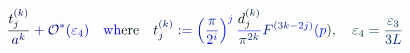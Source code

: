 \documentclass[12pt]{article}
\begin{document}
\makeatletter
\renewcommand*{\@textcolor}[3]{%
  \protect\leavevmode
  \begingroup
    \color#1{#2}#3%
  \endgroup
}
\makeatother
\begin{displaymath}
\mathcolor[RGB]{0,0,15}{\frac { \mathcolor[RGB]{0,0,30}{t} _ { \mathcolor[RGB]{0,0,45}{j} } ^ { \mathcolor[RGB]{0,0,60}{(} \mathcolor[RGB]{0,0,75}{k} \mathcolor[RGB]{0,0,90}{)} } } { \mathcolor[RGB]{0,0,105}{a} ^ { \mathcolor[RGB]{0,0,120}{k} } } } \mathcolor[RGB]{0,0,135}{+} \mathcal { \mathcolor[RGB]{0,0,150}{O} } ^ { \mathcolor[RGB]{0,0,165}{*} } \mathcolor[RGB]{0,0,180}{(} \mathcolor[RGB]{0,0,195}{\varepsilon} _ { \mathcolor[RGB]{0,0,210}{4} } \mathcolor[RGB]{0,0,225}{)} \quad \mathrm { \mathcolor[RGB]{0,0,240}{w} \mathcolor[RGB]{0,0,255}{h} \mathcolor[RGB]{0,15,0}{e} \mathcolor[RGB]{0,15,15}{r} \mathcolor[RGB]{0,15,30}{e} } \quad \mathcolor[RGB]{0,15,45}{t} _ { \mathcolor[RGB]{0,15,60}{j} } ^ { \mathcolor[RGB]{0,15,75}{(} \mathcolor[RGB]{0,15,90}{k} \mathcolor[RGB]{0,15,105}{)} } \mathcolor[RGB]{0,15,120}{:} \mathcolor[RGB]{0,15,135}{=} \mathcolor[RGB]{0,15,150}{\left(} \mathcolor[RGB]{0,15,165}{\frac { \mathcolor[RGB]{0,15,180}{\pi} } { \mathcolor[RGB]{0,15,195}{2} ^ { \mathcolor[RGB]{0,15,210}{i} } } } \mathcolor[RGB]{0,15,225}{\right)} ^ { \mathcolor[RGB]{0,15,240}{j} } \mathcolor[RGB]{0,15,255}{\frac { \mathcolor[RGB]{0,30,0}{d} _ { \mathcolor[RGB]{0,30,15}{j} } ^ { \mathcolor[RGB]{0,30,30}{(} \mathcolor[RGB]{0,30,45}{k} \mathcolor[RGB]{0,30,60}{)} } } { \mathcolor[RGB]{0,30,75}{\pi} ^ { \mathcolor[RGB]{0,30,90}{2} \mathcolor[RGB]{0,30,105}{k} } } } \mathcolor[RGB]{0,30,120}{F} ^ { \mathcolor[RGB]{0,30,135}{(} \mathcolor[RGB]{0,30,150}{3} \mathcolor[RGB]{0,30,165}{k} \mathcolor[RGB]{0,30,180}{-} \mathcolor[RGB]{0,30,195}{2} \mathcolor[RGB]{0,30,210}{j} \mathcolor[RGB]{0,30,225}{)} } \mathcolor[RGB]{0,30,240}{(} \mathcolor[RGB]{0,30,255}{p} \mathcolor[RGB]{0,45,0}{)} \mathcolor[RGB]{0,45,15}{,} \quad \mathcolor[RGB]{0,45,30}{\varepsilon} _ { \mathcolor[RGB]{0,45,45}{4} } \mathcolor[RGB]{0,45,60}{=} \mathcolor[RGB]{0,45,75}{\frac { \mathcolor[RGB]{0,45,90}{\varepsilon} _ { \mathcolor[RGB]{0,45,105}{3} } } { \mathcolor[RGB]{0,45,120}{3} \mathcolor[RGB]{0,45,135}{L} } }
\end{displaymath}
\end{document}
